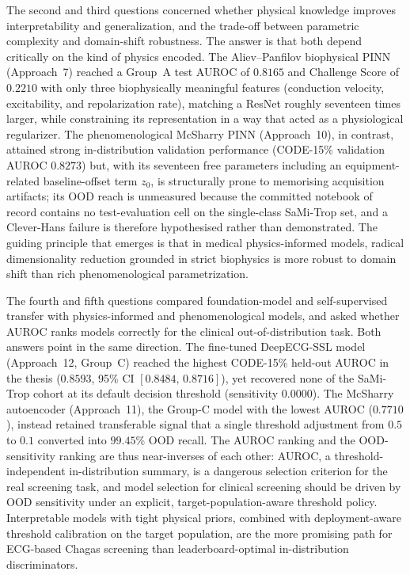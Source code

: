 The second and third questions concerned whether physical knowledge improves interpretability and generalization, and the trade-off between parametric complexity and domain-shift robustness. The answer is that both depend critically on the kind of physics encoded. The Aliev--Panfilov biophysical PINN (Approach~7) reached a Group~A test AUROC of $0.8165$ and Challenge Score of $0.2210$ with only three biophysically meaningful features (conduction velocity, excitability, and repolarization rate), matching a ResNet roughly seventeen times larger, while constraining its representation in a way that acted as a physiological regularizer. The phenomenological McSharry PINN (Approach~10), in contrast, attained strong in-distribution validation performance (CODE-15\% validation AUROC $0.8273$) but, with its seventeen free parameters including an equipment-related baseline-offset term $z_0$, is structurally prone to memorising acquisition artifacts; its OOD reach is unmeasured because the committed notebook of record contains no test-evaluation cell on the single-class SaMi-Trop set, and a Clever-Hans failure is therefore hypothesised rather than demonstrated. The guiding principle that emerges is that in medical physics-informed models, radical dimensionality reduction grounded in strict biophysics is more robust to domain shift than rich phenomenological parametrization.

The fourth and fifth questions compared foundation-model and self-supervised transfer with physics-informed and phenomenological models, and asked whether AUROC ranks models correctly for the clinical out-of-distribution task. Both answers point in the same direction. The fine-tuned DeepECG-SSL model (Approach~12, Group~C) reached the highest CODE-15\% held-out AUROC in the thesis ($0.8593$, 95\% CI $[0.8484,\,0.8716]$), yet recovered none of the SaMi-Trop cohort at its default decision threshold (sensitivity $0.0000$). The McSharry autoencoder (Approach~11), the Group-C model with the lowest AUROC ($0.7710$), instead retained transferable signal that a single threshold adjustment from $0.5$ to $0.1$ converted into $99.45\%$ OOD recall. The AUROC ranking and the OOD-sensitivity ranking are thus near-inverses of each other: AUROC, a threshold-independent in-distribution summary, is a dangerous selection criterion for the real screening task, and model selection for clinical screening should be driven by OOD sensitivity under an explicit, target-population-aware threshold policy. Interpretable models with tight physical priors, combined with deployment-aware threshold calibration on the target population, are the more promising path for ECG-based Chagas screening than leaderboard-optimal in-distribution discriminators.
